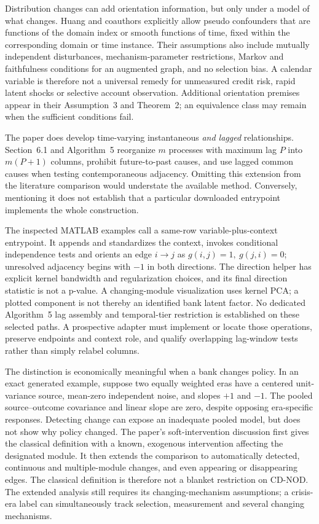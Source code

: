 Distribution changes can add orientation information, but only under a model
of what changes. Huang and coauthors explicitly allow pseudo confounders that
are functions of the domain index or smooth functions of time, fixed within
the corresponding domain or time instance. Their assumptions also include
mutually independent disturbances, mechanism-parameter restrictions,
Markov and faithfulness conditions for an augmented graph, and no selection
bias. A calendar variable is therefore not a universal remedy for unmeasured
credit risk, rapid latent shocks or selective account observation.
Additional orientation premises appear in their Assumption~3 and Theorem~2;
an equivalence class may remain when the sufficient conditions fail.
\citep{exec17_temporal_cdnod_paper}

The paper does develop time-varying instantaneous \emph{and lagged}
relationships. Section~6.1 and Algorithm~5 reorganize $m$ processes with
maximum lag $P$ into $m(P+1)$ columns, prohibit future-to-past causes, and use
lagged common causes when testing contemporaneous adjacency. Omitting this
extension from the literature comparison would understate the available
method. Conversely, mentioning it does not establish that a particular
downloaded entrypoint implements the whole construction.
\citep{exec17_temporal_cdnod_paper}

The inspected MATLAB examples call a same-row variable-plus-context
entrypoint. It appends and standardizes the context, invokes conditional
independence tests and orients an edge $i\to j$ as
$g(i,j)=1,\ g(j,i)=0$; unresolved adjacency begins with $-1$ in both
directions. The direction helper has explicit kernel bandwidth and
regularization choices, and its final direction statistic is not a p-value.
A changing-module visualization uses kernel PCA; a plotted component is not
thereby an identified bank latent factor. No dedicated Algorithm~5 lag
assembly and temporal-tier restriction is established on these selected
paths. A prospective adapter must implement or locate those operations,
preserve endpoints and context role, and qualify overlapping lag-window
tests rather than simply relabel columns.
\citep{exec17_temporal_cdnod}

The distinction is economically meaningful when a bank changes policy.
In an exact generated example, suppose two equally weighted eras have a
centered unit-variance source, mean-zero independent noise, and slopes
$+1$ and $-1$. The pooled source--outcome covariance and linear slope are
zero, despite opposing era-specific responses. Detecting change can expose
an inadequate pooled model, but does not show why policy changed. The paper's
soft-intervention discussion first gives the classical definition with a
known, exogenous intervention affecting the designated module. It then
extends the comparison to automatically detected, continuous and
multiple-module changes, and even appearing or disappearing edges.
The classical definition is therefore not a blanket restriction on CD-NOD.
The extended analysis still requires its changing-mechanism assumptions;
a crisis-era label can simultaneously track selection, measurement and
several changing mechanisms.
\citep{exec17_temporal_oracle,exec17_temporal_cdnod_paper}

